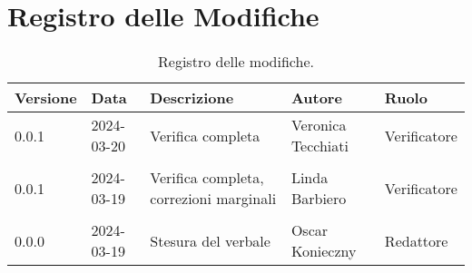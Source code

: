 \section*{Registro delle Modifiche}
\begin{table}[ht!]	
		\centering
		\begin{tabular}{p{1.2cm} p{2cm} p{6cm} p{3cm} p{2cm}}
			\toprule
			\textbf{Versione}& \textbf{Data} & \textbf{Descrizione} & \textbf{Autore} & \textbf{Ruolo} \\
			\midrule
			0.0.1 & 2024-03-20 & Verifica completa & Veronica Tecchiati & Verificatore \\\\
			0.0.1 & 2024-03-19 & Verifica completa, correzioni marginali & Linda Barbiero & Verificatore \\\\
			0.0.0 & 2024-03-19 & Stesura del verbale & Oscar Konieczny & Redattore \\
			\bottomrule
		\end{tabular}
		\caption{Registro delle modifiche.}
		\label{table:Registro delle modifiche}
\end{table}

